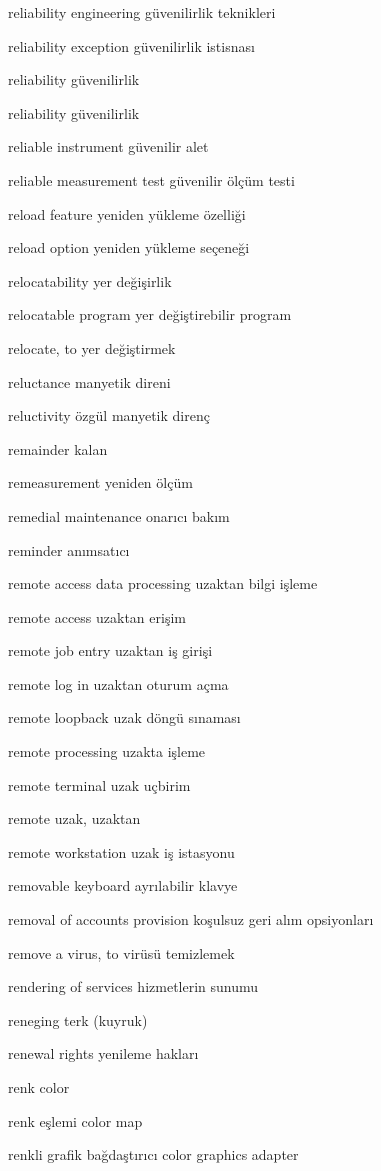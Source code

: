 \documentclass[12pt,fleqn]{article}\usepackage{../../common}
\begin{document}
reliability engineering güvenilirlik teknikleri

reliability exception güvenilirlik istisnası

reliability güvenilirlik

reliability güvenilirlik

reliable instrument güvenilir alet

reliable measurement test güvenilir ölçüm testi

reload feature yeniden yükleme özelliği

reload option yeniden yükleme seçeneği

relocatability yer değişirlik

relocatable program yer değiştirebilir program

relocate, to yer değiştirmek

reluctance manyetik direni

reluctivity özgül manyetik direnç

remainder kalan

remeasurement yeniden ölçüm

remedial maintenance onarıcı bakım

reminder anımsatıcı

remote access data processing uzaktan bilgi işleme

remote access uzaktan erişim

remote job entry uzaktan iş girişi

remote log in uzaktan oturum açma

remote loopback uzak döngü sınaması

remote processing uzakta işleme

remote terminal uzak uçbirim

remote uzak, uzaktan

remote workstation uzak iş istasyonu

removable keyboard ayrılabilir klavye

removal of accounts provision koşulsuz geri alım opsiyonları

remove a virus, to virüsü temizlemek

rendering of services hizmetlerin sunumu

reneging terk (kuyruk)

renewal rights yenileme hakları

renk color

renk eşlemi color map

renkli grafik bağdaştırıcı color graphics adapter
\end{document}
